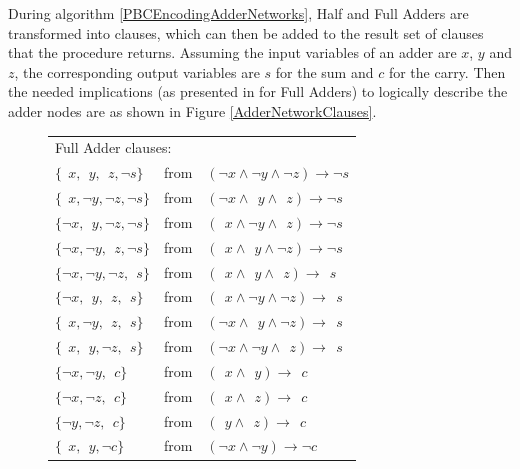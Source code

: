During algorithm \ref{PBCEncodingAdderNetworks}, Half and Full Adders are transformed into clauses, which can then be added to the result set of clauses that the procedure returns. Assuming the input variables of an adder are $x$, $y$ and $z$, the corresponding output variables are $s$ for the sum and $c$ for the carry. Then the needed implications (as presented in \cite{Een2006TranslatingPC} for Full Adders) to logically describe the adder nodes are as shown in Figure \ref{AdderNetworkClauses}.

\begin{figure}
    \centering
    \begin{tabular}{l l l}
    \multicolumn {3}{l}{Full Adder clauses:}\\
     $\{~~x,~~y,~~z,\neg s\}$           & from & $(\neg x   \land \neg y    \land \neg z)   \rightarrow \neg s$ \\
     $\{~~x,\neg y,\neg z,\neg s\}$     & from & $(\neg x   \land ~~y       \land ~~z)      \rightarrow \neg s$ \\
     $\{\neg x,~~y,\neg z,\neg s\}$     & from & $(~~x      \land \neg y    \land ~~z)      \rightarrow \neg s$ \\
     $\{\neg x,\neg y,~~z,\neg s\}$     & from & $(~~x      \land ~~y       \land \neg z)   \rightarrow \neg s$ \\
     $\{\neg x,\neg y,\neg z, ~~s\}$    & from & $(~~x      \land ~~y       \land ~~z)      \rightarrow ~~s$ \\
     $\{\neg x, ~~y, ~~z, ~~s\}$        & from & $(~~x      \land \neg y    \land \neg z)   \rightarrow ~~s$ \\
     $\{~~x, \neg y, ~~z, ~~s\}$        & from & $(\neg x   \land ~~y       \land \neg z)   \rightarrow ~~s$ \\
     $\{~~x, ~~y, \neg z, ~~s\}$        & from & $(\neg x   \land \neg y    \land ~~z)      \rightarrow ~~s$ \\
     $\{\neg x, \neg y, ~~c\}$          & from & $(~~x      \land ~~y)      \rightarrow ~~c$ \\
     $\{\neg x, \neg z, ~~c\}$          & from & $(~~x      \land ~~z)      \rightarrow ~~c$ \\
     $\{\neg y, \neg z, ~~c\}$          & from & $(~~y      \land ~~z)      \rightarrow ~~c$ \\
     $\{~~x, ~~y, \neg c\}$          & from & $(\neg x      \land \neg y)   \rightarrow \neg c$ \\

\end{tabular}
\end{figure}
